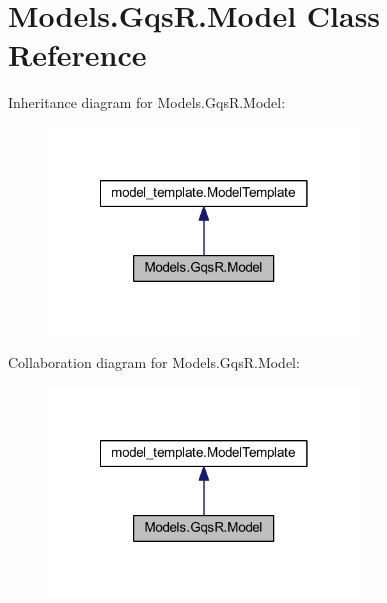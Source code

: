 \hypertarget{class_models_1_1_gqs_r_1_1_model}{\section{Models.\-Gqs\-R.\-Model Class Reference}
\label{class_models_1_1_gqs_r_1_1_model}
}


Inheritance diagram for Models.\-Gqs\-R.\-Model\-:
\nopagebreak
\begin{figure}[H]
\begin{center}
\leavevmode
\includegraphics[width=234pt]{class_models_1_1_gqs_r_1_1_model__inherit__graph}
\end{center}
\end{figure}


Collaboration diagram for Models.\-Gqs\-R.\-Model\-:
\nopagebreak
\begin{figure}[H]
\begin{center}
\leavevmode
\includegraphics[width=234pt]{class_models_1_1_gqs_r_1_1_model__coll__graph}
\end{center}
\end{figure}
